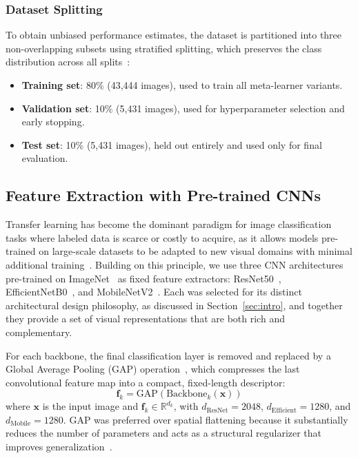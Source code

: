 \documentclass[pdflatex,sn-basic]{sn-jnl}
\begin{document}
\subsubsection{Dataset Splitting}

To obtain unbiased performance estimates, the dataset is partitioned into three non-overlapping subsets using stratified splitting, which preserves the class distribution across all splits~\cite{kohavi1995study}:
\begin{itemize}
    \item \textbf{Training set}: 80\% (43,444 images), used to train all meta-learner variants.
    \item \textbf{Validation set}: 10\% (5,431 images), used for hyperparameter selection and early stopping.
    \item \textbf{Test set}: 10\% (5,431 images), held out entirely and used only for final evaluation.
\end{itemize}

\subsection{Feature Extraction with Pre-trained CNNs}
\label{subsec:feature_extraction}

Transfer learning has become the dominant paradigm for image classification tasks where labeled data is scarce or costly to acquire, as it allows models pre-trained on large-scale datasets to be adapted to new visual domains with minimal additional training~\cite{pan2010survey}. Building on this principle, we use three CNN architectures pre-trained on ImageNet~\cite{deng2009imagenet} as fixed feature extractors: ResNet50~\cite{resnet}, EfficientNetB0~\cite{efficientnet}, and MobileNetV2~\cite{mobilenetv2}. Each was selected for its distinct architectural design philosophy, as discussed in Section~\ref{sec:intro}, and together they provide a set of visual representations that are both rich and complementary.

For each backbone, the final classification layer is removed and replaced by a Global Average Pooling (GAP) operation~\cite{lin2013network}, which compresses the last convolutional feature map into a compact, fixed-length descriptor:
\begin{equation}
    \mathbf{f}_k = \mathrm{GAP}\!\left(\mathrm{Backbone}_k(\mathbf{x})\right)
    \label{eq:feature_extraction}
\end{equation}
where $\mathbf{x}$ is the input image and $\mathbf{f}_k \in \mathbb{R}^{d_k}$, with $d_{\text{ResNet}} = 2048$, $d_{\text{Efficient}} = 1280$, and $d_{\text{Mobile}} = 1280$. GAP was preferred over spatial flattening because it substantially reduces the number of parameters and acts as a structural regularizer that improves generalization~\cite{lin2013network}.
\end{document}
